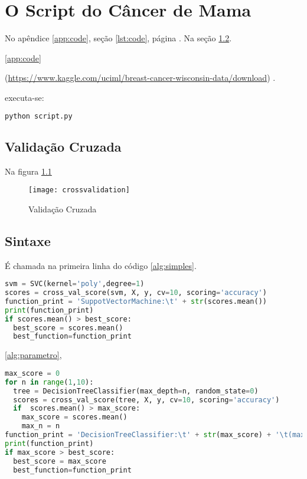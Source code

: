 \chapter{O Script do Câncer de Mama}
\label{chapter:o_script_do_cancer_de_mama}


No apêndice \ref{app:code}, seção
\ref{lst:code}, página \pageref{lst:code}.
Na seção \ref{sintaxe}.

 \cite{PYTHON} 
  \ref{app:code} 
  
(\url{https://www.kaggle.com/uciml/breast-cancer-wisconsin-data/download}) \cite{BREASTCANCER}.

executa-se:

\begin{lstlisting}[language=Python, caption=Executar Script.py]
python script.py
\end{lstlisting}

\section{Validação Cruzada}

Na figura \ref{fig:crossvalidation}

\begin{figure}[H]
\begin{center}
\caption{Validação Cruzada}
\texttt{[image: crossvalidation]}
\label{fig:crossvalidation}
\end{center}
\end{figure}

\section{Sintaxe}
\label{sintaxe}
É chamada na primeira linha do código \ref{alg:simples}.


\begin{lstlisting}[language=Python, caption=Sintaxe Simples, label=alg:simples]
svm = SVC(kernel='poly',degree=1)
scores = cross_val_score(svm, X, y, cv=10, scoring='accuracy')
function_print = 'SuppotVectorMachine:\t' + str(scores.mean())
print(function_print)
if scores.mean() > best_score:
  best_score = scores.mean()
  best_function=function_print
\end{lstlisting}

\ref{alg:parametro},

\begin{lstlisting}[language=Python, caption=Sintaxe com Parâmetro, label=alg:parametro]
max_score = 0
for n in range(1,10):
  tree = DecisionTreeClassifier(max_depth=n, random_state=0)
  scores = cross_val_score(tree, X, y, cv=10, scoring='accuracy')
  if  scores.mean() > max_score:
    max_score = scores.mean()
    max_n = n
function_print = 'DecisionTreeClassifier:\t' + str(max_score) + '\t(max_depth=' + str(max_n) + ')'
print(function_print)
if max_score > best_score:
  best_score = max_score
  best_function=function_print
\end{lstlisting}

